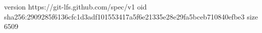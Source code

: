 version https://git-lfs.github.com/spec/v1
oid sha256:2909285f6136cfc1d3adf101553417a5f6e21335e28e29fa5bceb710840efbe3
size 6509
